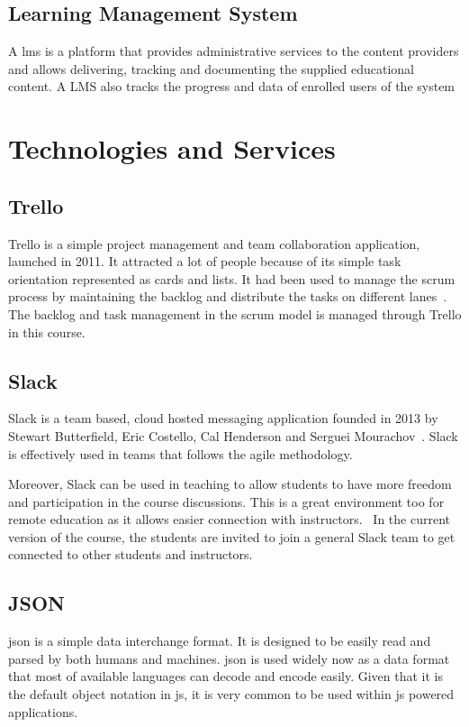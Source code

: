 \subsection{Learning Management System}
\label{sub:lms}
A \ac{lms} is a platform that provides administrative services to the content providers and allows delivering, tracking and
documenting the supplied educational content. A \ac{LMS} also tracks the progress and data of enrolled users of the system~\cite{lms_1}


\section{Technologies and Services}
\label{sec:technologies}

\subsection{Trello\texttrademark{}}
\label{sub:trello}
Trello\texttrademark{} is a simple project management and team collaboration application, launched in 2011\cite{rao_2011}. It attracted a lot
of people because of its simple task orientation represented as cards and lists. It had been used to manage the scrum process by maintaining the backlog
and distribute the tasks on different lanes~\cite{trello_scrum}\cite{trello_scrum_2}. The backlog and task management in the scrum
model is managed through Trello\texttrademark{} in this course.

\subsection{Slack\texttrademark{}}
\label{sub:slack}
Slack\texttrademark{} is a team based, cloud hosted messaging application founded in 2013 by Stewart Butterfield, Eric Costello, Cal Henderson
and Serguei Mourachov~\cite{kumparak_2015}. Slack\texttrademark{} is effectively used in teams that follows the agile methodology.~\cite{claps_2015}\cite{davies_2016}

\newParagraph
Moreover, Slack can be used in teaching to allow students to have more freedom and participation in the course discussions. This is a
great environment too for remote education as it allows easier connection with instructors.~\cite{medium_slack_2015}\cite{slack_education} In the current
version of the course, the students are invited to join a general Slack\texttrademark{} team to get connected to other students and instructors.

\subsection{JSON}
\label{sub:json}
\ac{json} is a simple data interchange format. It is designed to be easily read and parsed by both humans and machines.
\ac{json} is used widely now as a data format that most of available languages can decode and encode easily. Given that it is the default
object notation in \ac{js}, it is very common to be used within \ac{js} powered applications.~\cite{json}


